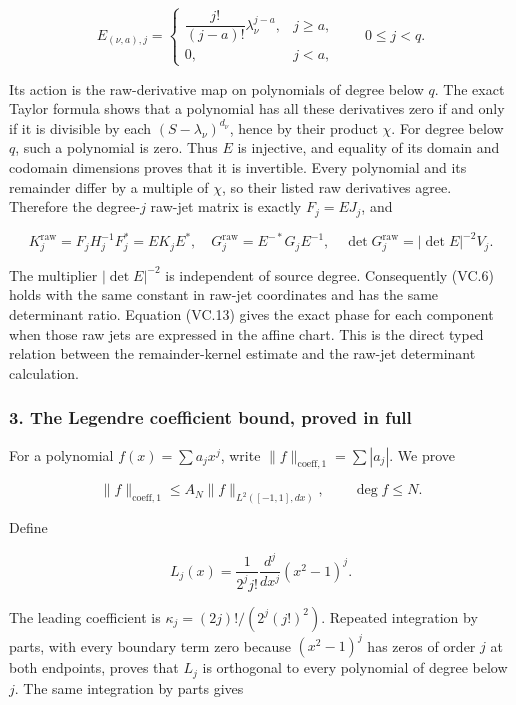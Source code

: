 \[
 E_{(\nu,a),j}=
 \begin{cases}
 \dfrac{j!}{(j-a)!}\lambda_\nu^{j-a},&j\ge a,\\
 0,&j<a,
 \end{cases}
 \qquad 0\le j<q.
\tag{VC.15a}
\]

Its action is the raw-derivative map on polynomials of degree below \(q\). The exact Taylor formula shows that a polynomial has all these derivatives zero if and only if it is divisible by each \((S-\lambda_\nu)^{d_\nu}\), hence by their product \(\chi\). For degree below \(q\), such a polynomial is zero. Thus \(E\) is injective, and equality of its domain and codomain dimensions proves that it is invertible. Every polynomial and its remainder differ by a multiple of \(\chi\), so their listed raw derivatives agree. Therefore the degree-\(j\) raw-jet matrix is exactly \(F_j=EJ_j\), and

\[
 K_j^{\mathrm{raw}}=F_jH_j^{-1}F_j^*=EK_jE^*,\quad
 G_j^{\mathrm{raw}}=E^{-*}G_jE^{-1},\quad
 \det G_j^{\mathrm{raw}}=|\det E|^{-2}V_j.
\tag{VC.15b}
\]

The multiplier \(|\det E|^{-2}\) is independent of source degree. Consequently (VC.6) holds with the same constant in raw-jet coordinates and has the same determinant ratio. Equation (VC.13) gives the exact phase for each component when those raw jets are expressed in the affine chart. This is the direct typed relation between the remainder-kernel estimate and the raw-jet determinant calculation.

\subsubsection{3. The Legendre coefficient bound, proved in full}\label{endpoint-volume_connection_original--the-legendre-coefficient-bound-proved-in-full}

For a polynomial \(f(x)=\sum a_jx^j\), write \(\|f\|_{\mathrm{coeff},1}=\sum|a_j|\). We prove

\[
 \|f\|_{\mathrm{coeff},1}\le A_N\|f\|_{L^2([-1,1],dx)},
 \qquad \deg f\le N.
\tag{VC.16}
\]

Define

\[
 L_j(x)=\frac{1}{2^jj!}\frac{d^j}{dx^j}(x^2-1)^j.
\tag{VC.17}
\]

The leading coefficient is \(\kappa_j=(2j)!/(2^j(j!)^2)\). Repeated integration by parts, with every boundary term zero because \((x^2-1)^j\) has zeros of order \(j\) at both endpoints, proves that \(L_j\) is orthogonal to every polynomial of degree below \(j\). The same integration by parts gives

